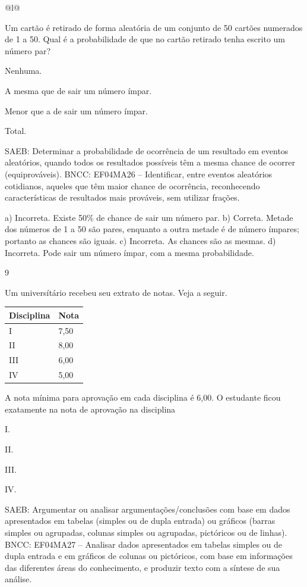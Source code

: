 \begin{mdframed}[linewidth=2pt,linecolor=salmao,roundcorner=2pt]
\begin{escolha}
{{{\begin{longtable}[]{@{}l@{}}
\begin{itemize}
{Um cartão é retirado de forma aleatória de um conjunto de 50 cartões
numerados de 1 a 50. Qual é a probabilidade de que no cartão retirado
tenha escrito um número par?

\begin{escolha}
\item
  Nenhuma.
\item
  A mesma que de sair um número ímpar.
\item
  Menor que a de sair um número ímpar.
\item
  Total.
\end{escolha}

SAEB: Determinar a probabilidade de ocorrência de um
resultado em eventos aleatórios, quando todos os resultados possíveis
têm a mesma chance de ocorrer (equiprováveis).
BNCC: EF04MA26 -- Identificar, entre eventos aleatórios cotidianos, aqueles que têm maior chance de
ocorrência, reconhecendo características de resultados mais prováveis, sem utilizar frações.

a) Incorreta. Existe 50\% de chance de sair um número par.
b) Correta. Metade dos números de 1 a 50 são pares, enquanto a outra metade é de número ímpares; portanto as chances são iguais.
c) Incorreta. As chances são as mesmas.
d) Incorreta. Pode sair um número ímpar, com a mesma probabilidade.

\num{9}

Um universítário recebeu seu extrato de notas. Veja a seguir.

\begin{longtable}[]{@{}ll@{}}
\toprule
Disciplina & Nota\tabularnewline
\midrule
\endhead
I & 7,50\tabularnewline
II & 8,00\tabularnewline
III & 6,00\tabularnewline
IV & 5,00\tabularnewline
\bottomrule
\end{longtable}

A nota mínima para aprovação em cada disciplina é 6,00. O estudante ficou exatamente na nota de aprovação na disciplina

\begin{escolha}
\item
  I.
\item
  II.
\item
  III.
\item
  IV.
\end{escolha}

SAEB: Argumentar ou analisar argumentações/conclusões com
base em dados apresentados em tabelas (simples ou de dupla entrada) ou
gráficos (barras simples ou agrupadas, colunas simples ou agrupadas,
pictóricos ou de linhas).
BNCC: EF04MA27 -- Analisar dados apresentados em tabelas simples ou de dupla entrada e em gráficos de
colunas ou pictóricos, com base em informações das diferentes áreas do conhecimento, e produzir
texto com a síntese de sua análise.

}
\end{itemize}
\end{longtable}}}}
\end{escolha}
\end{mdframed}
